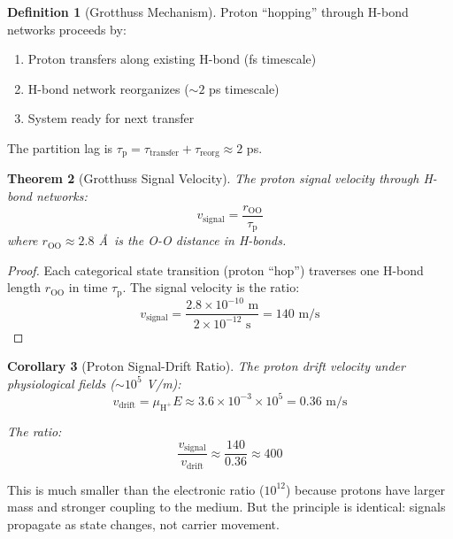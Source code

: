 \documentclass[twocolumn,10pt]{article}
\newtheorem{theorem}{Theorem}[section]
\newtheorem{corollary}[theorem]{Corollary}
\theoremstyle{definition}
\newtheorem{definition}[theorem]{Definition}
\theoremstyle{remark}
\newcommand{\taup}{\tau_{\mathrm{p}}}
\begin{document}
\begin{definition}[Grotthuss Mechanism]
\label{def:grotthuss}
Proton ``hopping'' through H-bond networks proceeds by:
\begin{enumerate}
    \item Proton transfers along existing H-bond (fs timescale)
    \item H-bond network reorganizes ($\sim 2$ ps timescale)
    \item System ready for next transfer
\end{enumerate}
The partition lag is $\taup = \tau_{\text{transfer}} + \tau_{\text{reorg}} \approx 2$ ps.
\end{definition}

\begin{theorem}[Grotthuss Signal Velocity]
\label{thm:grotthuss}
The proton signal velocity through H-bond networks:
\begin{equation}
v_{\text{signal}} = \frac{r_{\text{OO}}}{\taup}
\end{equation}
where $r_{\text{OO}} \approx 2.8$ \AA\ is the O-O distance in H-bonds.
\end{theorem}

\begin{proof}
Each categorical state transition (proton ``hop'') traverses one H-bond length $r_{\text{OO}}$ in time $\taup$. The signal velocity is the ratio:
\begin{equation}
v_{\text{signal}} = \frac{2.8 \times 10^{-10} \text{ m}}{2 \times 10^{-12} \text{ s}} = 140 \text{ m/s}
\end{equation}
\end{proof}

\begin{corollary}[Proton Signal-Drift Ratio]
\label{cor:proton_ratio}
The proton drift velocity under physiological fields ($\sim 10^5$ V/m):
\begin{equation}
v_{\text{drift}} = \mu_{\text{H}^+} E \approx 3.6 \times 10^{-3} \times 10^5 = 0.36 \text{ m/s}
\end{equation}

The ratio:
\begin{equation}
\frac{v_{\text{signal}}}{v_{\text{drift}}} \approx \frac{140}{0.36} \approx 400
\end{equation}
\end{corollary}

This is much smaller than the electronic ratio ($10^{12}$) because protons have larger mass and stronger coupling to the medium. But the principle is identical: signals propagate as state changes, not carrier movement.
\end{document}
